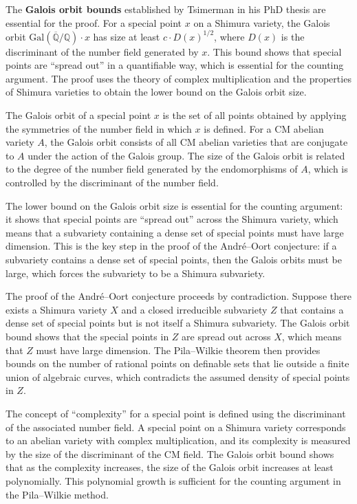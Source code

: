 The \textbf{Galois orbit bounds} established by Tsimerman in his PhD thesis are essential for the proof. For a special point $x$ on a Shimura variety, the Galois orbit $\mathrm{Gal}(\overline{\mathbb{Q}}/\mathbb{Q}) \cdot x$ has size at least $c \cdot D(x)^{1/2}$, where $D(x)$ is the discriminant of the number field generated by $x$. This bound shows that special points are ``spread out'' in a quantifiable way, which is essential for the counting argument. The proof uses the theory of complex multiplication and the properties of Shimura varieties to obtain the lower bound on the Galois orbit size.

The Galois orbit of a special point $x$ is the set of all points obtained by applying the symmetries of the number field in which $x$ is defined. For a CM abelian variety $A$, the Galois orbit consists of all CM abelian varieties that are conjugate to $A$ under the action of the Galois group. The size of the Galois orbit is related to the degree of the number field generated by the endomorphisms of $A$, which is controlled by the discriminant of the number field.

The lower bound on the Galois orbit size is essential for the counting argument: it shows that special points are ``spread out'' across the Shimura variety, which means that a subvariety containing a dense set of special points must have large dimension. This is the key step in the proof of the Andr\'{e}--Oort conjecture: if a subvariety contains a dense set of special points, then the Galois orbits must be large, which forces the subvariety to be a Shimura subvariety.

The proof of the Andr\'{e}--Oort conjecture proceeds by contradiction. Suppose there exists a Shimura variety $X$ and a closed irreducible subvariety $Z$ that contains a dense set of special points but is not itself a Shimura subvariety. The Galois orbit bound shows that the special points in $Z$ are spread out across $X$, which means that $Z$ must have large dimension. The Pila--Wilkie theorem then provides bounds on the number of rational points on definable sets that lie outside a finite union of algebraic curves, which contradicts the assumed density of special points in $Z$.

The concept of ``complexity'' for a special point is defined using the discriminant of the associated number field. A special point on a Shimura variety corresponds to an abelian variety with complex multiplication, and its complexity is measured by the size of the discriminant of the CM field. The Galois orbit bound shows that as the complexity increases, the size of the Galois orbit increases at least polynomially. This polynomial growth is sufficient for the counting argument in the Pila--Wilkie method.

